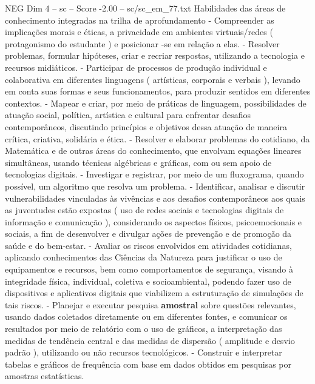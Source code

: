 \begin{textsample}{NEG Dim 4 – sc – Score -2.00 – sc/sc\_em\_77.txt}
Habilidades das áreas de conhecimento integradas na trilha de aprofundamento - Compreender as implicações morais e éticas, a privacidade em ambientes virtuais/redes ( protagonismo do estudante ) e posicionar -se em relação a elas. - Resolver problemas, formular hipóteses, criar e recriar respostas, utilizando a tecnologia e recursos midiáticos. - Participar de processos de produção individual e colaborativa em diferentes linguagens ( artísticas, corporais e verbais ), levando em conta suas formas e seus funcionamentos, para produzir sentidos em diferentes contextos. - Mapear e criar, por meio de práticas de linguagem, possibilidades de atuação social, política, artística e cultural para enfrentar desafios contemporâneos, discutindo princípios e objetivos dessa atuação de maneira crítica, criativa, solidária e ética. - Resolver e elaborar problemas do cotidiano, da Matemática e de outras áreas do conhecimento, que envolvam equações lineares simultâneas, usando técnicas algébricas e gráficas, com ou sem apoio de tecnologias digitais. - Investigar e registrar, por meio de um fluxograma, quando possível, um algoritmo que resolva um problema. - Identificar, analisar e discutir vulnerabilidades vinculadas às vivências e aos desafios contemporâneos aos quais as juventudes estão expostas ( uso de redes sociais e tecnologias digitais de informação e comunicação ), considerando os aspectos físicos, psicoemocionais e sociais, a fim de desenvolver e divulgar ações de prevenção e de promoção da saúde e do bem-estar. - Avaliar os riscos envolvidos em atividades cotidianas, aplicando conhecimentos das Ciências da Natureza para justificar o uso de equipamentos e recursos, bem como comportamentos de segurança, visando à integridade física, individual, coletiva e socioambiental, podendo fazer uso de dispositivos e aplicativos digitais que viabilizem a estruturação de simulações de tais riscos. - Planejar e executar pesquisa \textbf{amostral} sobre questões relevantes, usando dados coletados diretamente ou em diferentes fontes, e comunicar os resultados por meio de relatório com o uso de gráficos, a interpretação das medidas de tendência central e das medidas de dispersão ( amplitude e desvio padrão ), utilizando ou não recursos tecnológicos. - Construir e interpretar tabelas e gráficos de frequência com base em dados obtidos em pesquisas por amostras estatísticas.

\end{textsample}
